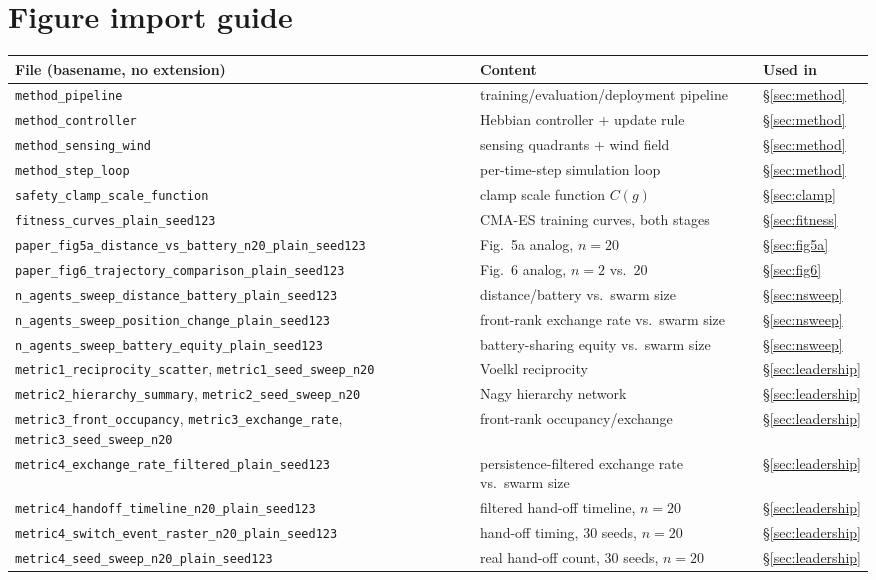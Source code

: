 \documentclass[11pt]{article}
\begin{document}
\section*{Figure import guide}
\begin{center}
\begin{tabular}{@{}lll@{}}
\toprule
\textbf{File (basename, no extension)} & \textbf{Content} & \textbf{Used in} \\
\midrule
\texttt{method\_pipeline} & training/evaluation/deployment pipeline & \S\ref{sec:method} \\
\texttt{method\_controller} & Hebbian controller + update rule & \S\ref{sec:method} \\
\texttt{method\_sensing\_wind} & sensing quadrants + wind field & \S\ref{sec:method} \\
\texttt{method\_step\_loop} & per-time-step simulation loop & \S\ref{sec:method} \\
\texttt{safety\_clamp\_scale\_function} & clamp scale function $C(g)$ & \S\ref{sec:clamp} \\
\texttt{fitness\_curves\_plain\_seed123} & CMA-ES training curves, both stages & \S\ref{sec:fitness} \\
\texttt{paper\_fig5a\_distance\_vs\_battery\_n20\_plain\_seed123} & Fig.~5a analog, $n{=}20$ & \S\ref{sec:fig5a} \\
\texttt{paper\_fig6\_trajectory\_comparison\_plain\_seed123} & Fig.~6 analog, $n{=}2$ vs.\ $20$ & \S\ref{sec:fig6} \\
\texttt{n\_agents\_sweep\_distance\_battery\_plain\_seed123} & distance/battery vs.\ swarm size & \S\ref{sec:nsweep} \\
\texttt{n\_agents\_sweep\_position\_change\_plain\_seed123} & front-rank exchange rate vs.\ swarm size & \S\ref{sec:nsweep} \\
\texttt{n\_agents\_sweep\_battery\_equity\_plain\_seed123} & battery-sharing equity vs.\ swarm size & \S\ref{sec:nsweep} \\
\texttt{metric1\_reciprocity\_scatter}, \texttt{metric1\_seed\_sweep\_n20} & Voelkl reciprocity & \S\ref{sec:leadership} \\
\texttt{metric2\_hierarchy\_summary}, \texttt{metric2\_seed\_sweep\_n20} & Nagy hierarchy network & \S\ref{sec:leadership} \\
\texttt{metric3\_front\_occupancy}, \texttt{metric3\_exchange\_rate}, \texttt{metric3\_seed\_sweep\_n20} & front-rank occupancy/exchange & \S\ref{sec:leadership} \\
\texttt{metric4\_exchange\_rate\_filtered\_plain\_seed123} & persistence-filtered exchange rate vs.\ swarm size & \S\ref{sec:leadership} \\
\texttt{metric4\_handoff\_timeline\_n20\_plain\_seed123} & filtered hand-off timeline, $n{=}20$ & \S\ref{sec:leadership} \\
\texttt{metric4\_switch\_event\_raster\_n20\_plain\_seed123} & hand-off timing, 30 seeds, $n{=}20$ & \S\ref{sec:leadership} \\
\texttt{metric4\_seed\_sweep\_n20\_plain\_seed123} & real hand-off count, 30 seeds, $n{=}20$ & \S\ref{sec:leadership} \\
\bottomrule
\end{tabular}
\end{center}
\end{document}
